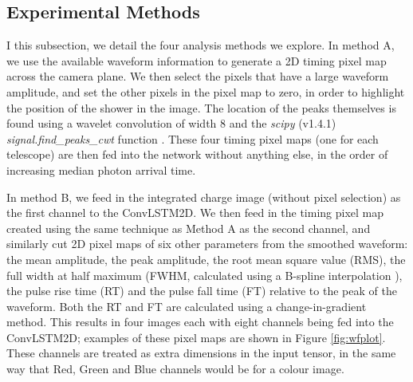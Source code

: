 \subsection{Experimental Methods}
I this subsection, we detail the four analysis methods we explore. In method A, we use the available waveform information to generate a 2D timing pixel map across the camera plane. We then select the pixels that have a large waveform amplitude, and set the other pixels in the pixel map to zero, in order to highlight the position of the shower in the image. The location of the peaks themselves is found using a wavelet convolution of width 8 and the \textit{scipy} (v1.4.1) \textit{signal.find\_peaks\_cwt} function \cite{scipy} \cite{findpeaks}. These four timing pixel maps (one for each telescope) are then fed into the network without anything else, in the order of increasing median photon arrival time.

In method B, we feed in the integrated charge image (without pixel selection) as the first channel to the ConvLSTM2D. We then feed in the timing pixel map created using the same technique as Method A as the second channel, and similarly cut 2D pixel maps of six other parameters from the smoothed waveform: the mean amplitude, the peak amplitude, the root mean square value (RMS), the full width at half maximum (FWHM, calculated using a B-spline interpolation \cite{scipy}), the pulse rise time (RT) and the pulse fall time (FT) relative to the peak of the waveform. Both the RT and FT are calculated using a change-in-gradient method. This results in four images each with eight channels being fed into the ConvLSTM2D; examples of these pixel maps are shown in Figure \ref{fig:wfplot}. These channels are treated as extra dimensions in the input tensor, in the same way that Red, Green and Blue channels would be for a colour image.

